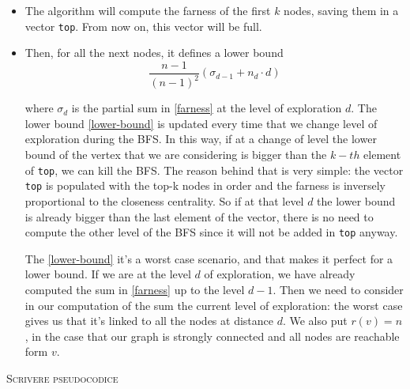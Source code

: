 \begin{itemize}
    \item The algorithm will compute the farness of the first $k$ nodes, saving them in a vector \texttt{top}. From now on, this vector will be full.

    \item Then, for all the next nodes, it defines a lower bound
    \begin{equation}\label{lower-bound}
        \frac{n-1}{(n-1)^2} (\sigma_{d-1} + n_d \cdot d)
    \end{equation}

    where $\sigma_d$ is the partial sum in \eqref{farness} at the level of exploration $d$. The lower bound \eqref{lower-bound} is updated every time that we change level of exploration during the BFS. In this way, if at a change of level the lower bound of the vertex that we are considering is bigger than the $k-th$ element of \texttt{top}, we can kill the BFS. The reason behind that is very simple: the vector \texttt{top} is populated with the top-k nodes in order and the farness is inversely proportional to the closeness centrality. So if at that level $d$ the lower bound is already bigger than the last element of the vector, there is no need to compute the other level of the BFS since it will not be added in \texttt{top} anyway. \s

    The \eqref{lower-bound} it's a worst case scenario, and that makes it perfect for a lower bound. If we are at the level $d$ of exploration, we have already computed the sum in \eqref{farness} up to the level $d-1$. Then we need to consider in our computation of the sum the current level of exploration: the worst case gives us that it's linked to all the nodes at distance $d$. We also put $r(v)=n$, in the case that our graph is strongly connected and all nodes are reachable form $v$.
\end{itemize}

\textsc{Scrivere pseudocodice}




